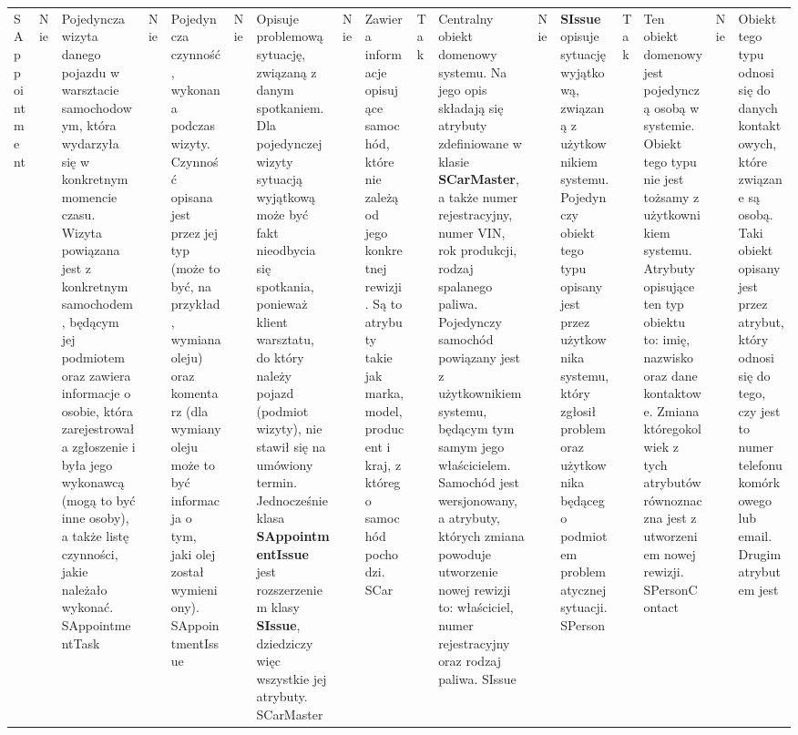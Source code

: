 \begin{center}
\begin{longtable}{| p{4cm} | p{2cm} | p{8cm} |}
			SAppointment 		& 
			Nie			 		&
			Pojedyncza wizyta danego pojazdu w warsztacie samochodowym, która wydarzyła się w konkretnym momencie czasu. Wizyta powiązana jest z konkretnym samochodem, będącym jej podmiotem oraz zawiera informacje 
			o osobie, która zarejestrowała zgłoszenie i była jego wykonawcą (mogą to być inne osoby), a także listę czynności, jakie należało wykonać.
			\hline
			SAppointmentTask 	& 
			Nie					&
			Pojedyncza czynność, wykonana podczas wizyty. Czynność opisana jest przez jej typ (może to być, na przykład, wymiana oleju) oraz komentarz (dla wymiany oleju może to być informacja o tym, jaki olej został wymieniony). 
			\hline
			SAppointmentIssue 	& 
			Nie					&
			Opisuje problemową sytuację, związaną z danym spotkaniem. Dla pojedynczej wizyty sytuacją wyjątkową może być fakt nieodbycia się spotkania, ponieważ klient warsztatu, do który należy pojazd (podmiot wizyty), nie stawił się
			na umówiony termin. Jednocześnie klasa \textbf{SAppointmentIssue} jest rozszerzeniem klasy \textbf{SIssue}, dziedziczy więc wszystkie jej atrybuty. 
			\hline
			SCarMaster 			&
			Nie					& 
			Zawiera informacje opisujące samochód, które nie zależą od jego konkretnej rewizji. Są to atrybuty takie jak marka, model, producent i kraj, z którego samochód pochodzi.
			\hline
			SCar 				&
			Tak 				& 
			Centralny obiekt domenowy systemu. Na jego opis składają się atrybuty zdefiniowane w klasie \textbf{SCarMaster}, a także numer rejestracyjny, numer VIN, rok produkcji, rodzaj spalanego paliwa. Pojedynczy samochód
			powiązany jest z użytkownikiem systemu, będącym tym samym jego właścicielem. Samochód jest wersjonowany, a atrybuty, których zmiana powoduje utworzenie nowej rewizji to: właściciel, numer rejestracyjny oraz rodzaj paliwa. 
			\hline
			SIssue 				&
		 	Nie 				&
		 	\textbf{SIssue} opisuje sytuację wyjątkową, związaną z użytkownikiem systemu. Pojedynczy obiekt tego typu opisany jest przez użytkownika systemu, który zgłosił problem oraz użytkownika będącego podmiotem
		 	problematycznej sytuacji. 
		 	\hline
			SPerson 			& 
			Tak 				& 
			Ten obiekt domenowy jest pojedynczą osobą w systemie. Obiekt tego typu nie jest tożsamy z użytkownikiem systemu. Atrybuty opisujące ten typ obiektu to: imię, nazwisko oraz dane kontaktowe. Zmiana któregokolwiek z tych	 atrybutów
			równoznaczna jest z utworzeniem nowej rewizji. 
			\hline
			SPersonContact 		&
			Nie 				&
			Obiekt tego typu odnosi się do danych kontaktowych, które związane są osobą. Taki obiekt opisany jest przez atrybut, który odnosi się do tego, czy jest to numer telefonu komórkowego lub email. Drugim atrybutem jest

\end{longtable}
\end{center}
